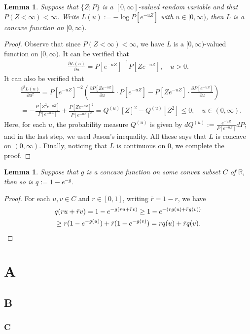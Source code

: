 \documentclass[12pt,a4paper]{amsart}
\numberwithin{equation}{section}
\theoremstyle{plain}
\newtheorem{lem}[thm]{Lemma}
\theoremstyle{definition}
\theoremstyle{remark}
\begin{document}
\begin{lem}
  \label{lem:ACP}
  Suppose that $\{Z; P\}$ is a $[0,\infty]$-valued random variable and that $P(Z < \infty)< \infty$. 
  Write $L(u):= - \log P[e^{- u Z}]$ with $u \in [0,\infty)$, then $L$ is a concave function on $[0,\infty)$.
\end{lem} 
\begin{proof}
  Observe that since $P(Z < \infty)< \infty$, we have $L$ is a $[0,\infty)$-valued function on $[0,\infty)$.
	It can be verified that
  \begin{align}
    \frac{\partial L(u)}{\partial u} = P[e^{-u Z}]^{-1} P[Ze^{- u Z}]
    , \quad u > 0.
  \end{align}
  It can also be verified that
  \begin{align}
    & \frac{\partial^2 L(u)}{\partial u^2}
    = P[e^{-uZ}]^{-2}( \frac{\partial P[Ze^{-uZ}]}{\partial u} \cdot P[e^{-uZ}] - P[Ze^{-uZ}] \cdot \frac{\partial P[e^{-uZ}]}{\partial u}) \\
    & = - \frac{P[Z^2 e^{-uZ}]}{P[e^{-uZ}]} + \frac{P[Ze^{-uZ}]^2}{P[e^{-uZ}]^2} 
= Q^{(u)}[Z]^2 - Q^{(u)}[Z^2] 
      \leq 0
      , \quad u \in (0,\infty).
  \end{align}
  Here, for each $u$, the probability measure $Q^{(u)}$ is given by $dQ^{(u)}:= \frac{e^{-uZ}}{P[e^{-uZ}]} dP$; and in the last step, we used Jason's inequality.
  All these says that $L$ is concave on $(0,\infty)$.
  Finally, noticing that $L$ is continuous on $0$, we complete the proof.
\end{proof}
\begin{lem}
	\label{lem:ACE}
  Suppose that $g$ is a concave function on some convex subset $C$ of $\mathbb R$, then so is $q:= 1- e^{-g}$.
\end{lem}

\begin{proof}
For each $u,v \in C$ and $r \in [0,1]$, writing $\bar r = 1-r$, we have
\begin{align}
	&q(ru+\bar r v) 
  = 1 - e^{- g(ru + \bar r v)}
  \geq 1 - e^{- ( r g(u) + \bar r g(v))} \\
  & \geq r(1- e^{- g(u)}) + \bar r (1 - e^{- g(v)})
    = rq(u) + \bar r q(v).
    \qedhere
\end{align}	
\end{proof}

\section{A}
\subsection{B}
\subsubsection{C}




\end{document}
